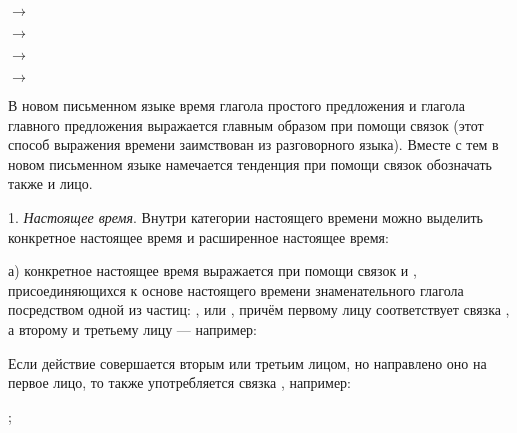 \begin{prfsample}
	\item {} $\rightarrow$
	\item \quad$\rightarrow$ 
	\item \quad$\rightarrow$ 
	\item \quad$\rightarrow$ 
\end{prfsample}

В новом письменном языке время глагола простого предложения и глагола главного предложения выражается главным образом при помощи связок (этот способ выражения времени заимствован из разговорного языка). Вместе с тем в новом письменном языке намечается тенденция при помощи связок обозначать также и лицо.

1. \emph{Настоящее время}. Внутри категории настоящего времени можно выделить конкретное настоящее время и расширенное настоящее время:

а) конкретное настоящее время выражается при помощи связок  и , присоединяющихся к основе настоящего времени знаменательного глагола посредством одной из частиц: ,  или , причём первому лицу соответствует связка , а второму и третьему лицу ---  например:
\begin{prfsample}
	\item {}
	\item {}
	\item {}
\end{prfsample}

Если действие совершается вторым или третьим лицом, но направлено оно на первое лицо, то также употребляется связка , например:
\begin{prfsample}
	\item {};
\end{prfsample}

